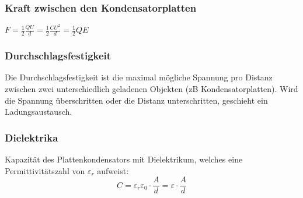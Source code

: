 \subsubsection{Kraft zwischen den Kondensatorplatten}

$F=\frac{1}{2} \frac{QU}{d} = \frac{1}{2} \frac{CU^2}{d} = \frac{1}{2} QE$

\subsubsection{Durchschlagsfestigkeit}

Die Durchschlagsfestigkeit ist die maximal mögliche Spannung pro Distanz
zwischen zwei unterschiedlich geladenen Objekten (zB Kondensatorplatten). Wird
die Spannung überschritten oder die Distanz unterschritten, geschieht ein
Ladungsaustausch.

\subsubsection{Dielektrika}

Kapazität des Plattenkondensators mit Dielektrikum, welches eine
Permittivitätszahl von $\varepsilon_r$ aufweist:
\[
	C = \varepsilon_r \varepsilon_0 \cdot \frac{A}{d} = \varepsilon \cdot \frac{A}{d}
\]
